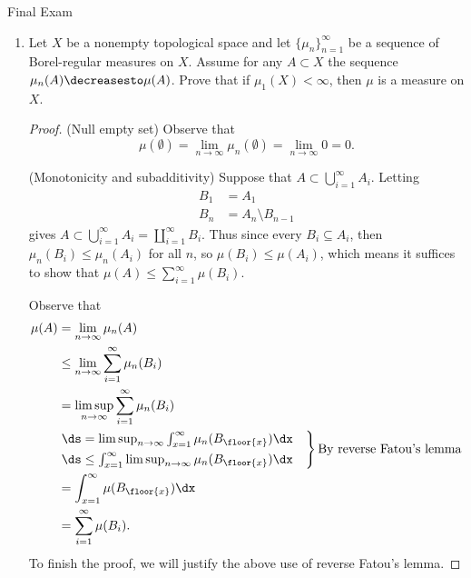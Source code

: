 \documentclass[12pt,letterpaper]{article}
\begin{document}
\pagestyle{fancy}
\begin{center}
{\Large Final Exam}%
\end{center}

\begin{enumerate}

\item Let $X$ be a nonempty topological space and let $\{\mu_n\}_{n=1}^\infty$ be a sequence of Borel-regular measures on $X$. Assume for any $A\subset X$ the sequence $\mu_n(A)\decreasesto\mu(A)$. Prove that if $\mu_1(X)<\infty$, then $\mu$ is a measure on $X$. 

\begin{proof}
(Null empty set) Observe that 
$$\mu(\emptyset)=\lim_{n\to\infty}\mu_n(\emptyset)=\lim_{n\to\infty}0=0.$$

(Monotonicity and subadditivity)
Suppose that $A\subset\bigcup_{i=1}^\infty A_i$. Letting 
\begin{align*}
B_1&=A_1 \\
B_n&=A_{n}\setminus B_{n-1}
\end{align*} 
gives $A\subset\bigcup_{i=1}^\infty A_i=\coprod_{i=1}^\infty B_i$. Thus since every $B_i\subseteq A_i$, then $\mu_n(B_i)\leq\mu_n(A_i)$ for all $n$, so $\mu(B_i)\leq\mu(A_i)$, which means it suffices to show that $\mu(A)\leq\sum_{i=1}^\infty \mu(B_i)$. 

Observe that 
\begin{align*}
\mu(A) &=\lim_{n\to\infty}\mu_n(A)\\
&\leq \lim_{n\to\infty}\sum_{i=1}^\infty \mu_n (B_i)\\
&= \limsup_{n\to\infty}\sum_{i=1}^\infty \mu_n (B_i)\\
&
\begin{rcases*}
\ds = \limsup_{n\to\infty}\int_{x=1}^\infty \mu_n (B_{\floor{x}}) \dx\\
\ds\leq \int_{x=1}^\infty \limsup_{n\to\infty} \mu_n (B_{\floor{x}}) \dx \quad 
\end{rcases*}\text{By reverse Fatou's lemma}\\
&=\int_{x=1}^\infty \mu (B_{\floor{x}}) \dx \\
&=\sum_{i=1}^\infty \mu(B_i).
\end{align*}
To finish the proof, we will justify the above use of reverse Fatou's lemma. 


\end{proof}
\end{enumerate}
\end{document}
